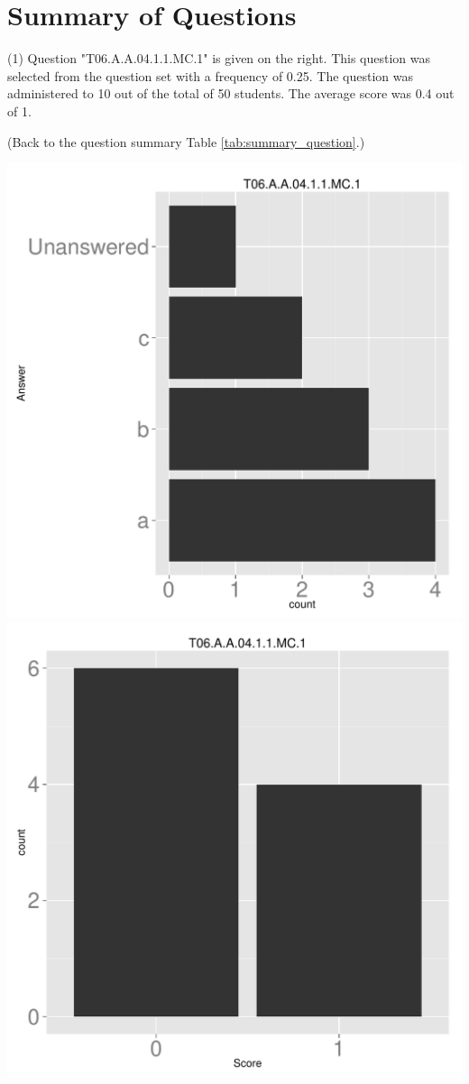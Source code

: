 \documentclass[12pt,english,nohyper]{tufte-handout}\usepackage[]{graphicx}\usepackage[]{color}
\begin{document}
\clearpage
\newpage{}
\section{Summary of Questions}

 (1) Question "T06.A.A.04.1.1.MC.1" is given on the right. This question was selected from the question set with a frequency of 0.25. The question was administered to 10 out of the total of 50 students. The average score was 0.4 out of 1.

 (Back to the question summary Table \ref{tab:summary_question}.)

\begin{center} \includegraphics[width=.45\linewidth]{Topic06_AB_1_answer} \includegraphics[width=.45\linewidth]{Topic06_AB_1_score} \end{center} 
\end{document}
